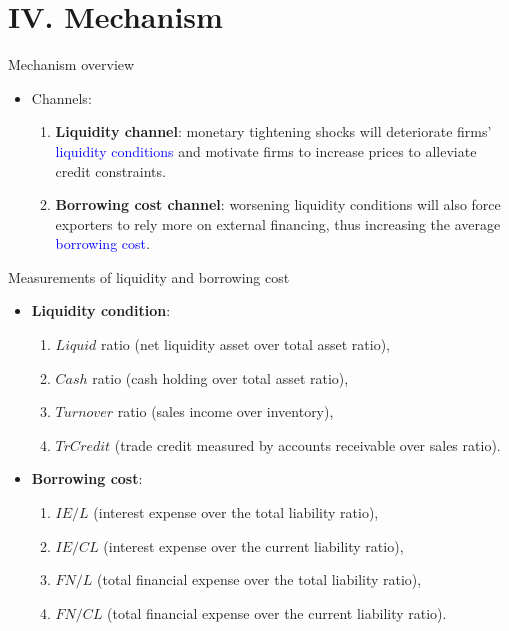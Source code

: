 \documentclass[10pt]{beamer}
\begin{document}

\section{IV. Mechanism}

\begin{frame}{Mechanism overview}
    \begin{itemize}
        \item Channels:
        \begin{enumerate}
           \item \textbf{Liquidity channel}: monetary tightening shocks will deteriorate firms' \textcolor{blue}{liquidity conditions} and motivate firms to increase prices to alleviate credit constraints.
           \medskip
           \item \textbf{Borrowing cost channel}: worsening liquidity conditions will also force exporters to rely more on external financing, thus increasing the average \textcolor{blue}{borrowing cost}.
        \end{enumerate}
    \end{itemize}
\end{frame}

\begin{frame}{Measurements of liquidity and borrowing cost}
    \begin{itemize}
        \item \textbf{Liquidity condition}: 
        \begin{enumerate}
            \item $Liquid$ ratio (net liquidity asset over total asset ratio),
            \item $Cash$ ratio (cash holding over total asset ratio),
            \item $Turnover$ ratio (sales income over inventory),
            \item $TrCredit$ (trade credit measured by accounts receivable over sales ratio).
        \end{enumerate} 
        \item \textbf{Borrowing cost}: 
        \begin{enumerate}
            \item $IE/L$ (interest expense over the total liability ratio),
            \item $IE/CL$ (interest expense over the current liability ratio),
            \item $FN/L$ (total financial expense over the total liability ratio),
            \item $FN/CL$ (total financial expense over the current liability ratio).
        \end{enumerate}
    \end{itemize}
\end{frame}
\end{document}
